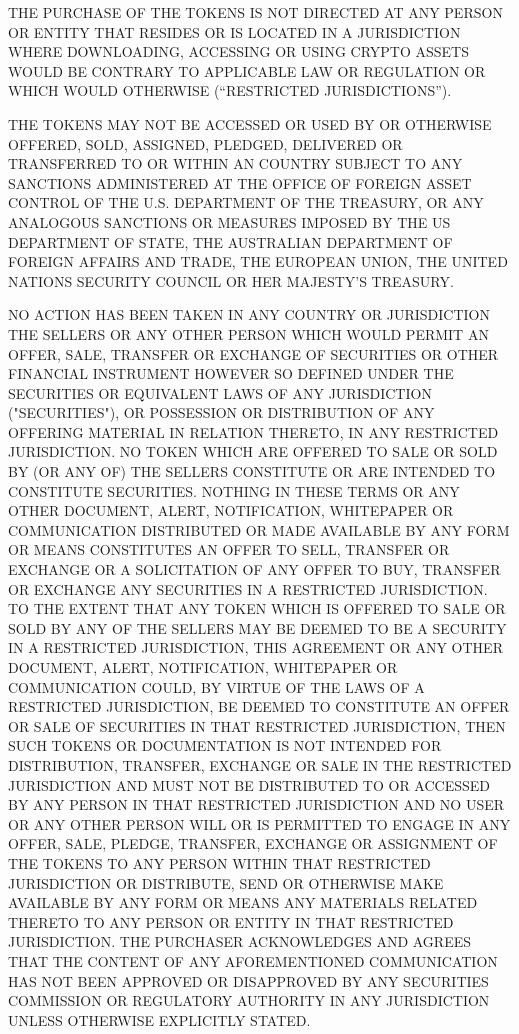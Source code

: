 ﻿\documentclass[a4paper]{article}
\begin{document}
THE PURCHASE OF THE TOKENS IS  NOT DIRECTED AT ANY PERSON OR ENTITY THAT RESIDES OR IS LOCATED IN A JURISDICTION WHERE DOWNLOADING, ACCESSING OR USING CRYPTO ASSETS WOULD BE CONTRARY TO APPLICABLE LAW OR REGULATION OR WHICH WOULD OTHERWISE (“RESTRICTED JURISDICTIONS”).
 
 
THE TOKENS MAY NOT BE ACCESSED OR USED BY OR OTHERWISE OFFERED, SOLD, ASSIGNED, PLEDGED, DELIVERED OR TRANSFERRED TO OR WITHIN AN COUNTRY SUBJECT TO ANY SANCTIONS ADMINISTERED AT THE OFFICE OF FOREIGN ASSET CONTROL OF THE U.S. DEPARTMENT OF THE TREASURY, OR ANY ANALOGOUS SANCTIONS OR MEASURES IMPOSED BY THE US DEPARTMENT OF STATE, THE AUSTRALIAN DEPARTMENT OF FOREIGN AFFAIRS AND TRADE, THE EUROPEAN UNION, THE UNITED NATIONS SECURITY COUNCIL OR HER MAJESTY'S TREASURY.
 
NO ACTION HAS BEEN TAKEN IN ANY COUNTRY OR JURISDICTION THE SELLERS OR ANY OTHER PERSON WHICH WOULD PERMIT AN OFFER, SALE, TRANSFER OR EXCHANGE OF SECURITIES OR OTHER FINANCIAL INSTRUMENT HOWEVER SO DEFINED UNDER THE SECURITIES OR EQUIVALENT LAWS OF ANY JURISDICTION ("SECURITIES"), OR POSSESSION OR DISTRIBUTION OF ANY OFFERING MATERIAL IN RELATION THERETO, IN ANY RESTRICTED JURISDICTION. NO TOKEN WHICH ARE OFFERED TO SALE OR SOLD BY (OR ANY OF) THE SELLERS CONSTITUTE OR ARE INTENDED TO CONSTITUTE SECURITIES.
NOTHING IN THESE TERMS OR ANY OTHER DOCUMENT, ALERT, NOTIFICATION, WHITEPAPER OR COMMUNICATION DISTRIBUTED OR MADE AVAILABLE BY ANY FORM OR MEANS CONSTITUTES AN OFFER TO SELL, TRANSFER OR EXCHANGE OR A SOLICITATION OF ANY OFFER TO BUY, TRANSFER OR EXCHANGE ANY SECURITIES IN A RESTRICTED JURISDICTION.
TO THE EXTENT THAT ANY TOKEN WHICH IS OFFERED TO SALE OR SOLD BY ANY OF THE SELLERS MAY BE DEEMED TO BE A SECURITY IN A RESTRICTED JURISDICTION, THIS AGREEMENT OR ANY OTHER DOCUMENT, ALERT, NOTIFICATION, WHITEPAPER OR COMMUNICATION COULD, BY VIRTUE OF THE LAWS OF A RESTRICTED JURISDICTION, BE DEEMED TO CONSTITUTE AN OFFER OR SALE OF SECURITIES IN THAT RESTRICTED JURISDICTION, THEN SUCH TOKENS OR DOCUMENTATION IS NOT INTENDED FOR DISTRIBUTION, TRANSFER, EXCHANGE OR SALE IN THE RESTRICTED JURISDICTION AND MUST NOT BE DISTRIBUTED TO OR ACCESSED BY ANY PERSON IN THAT RESTRICTED JURISDICTION AND NO USER OR ANY OTHER PERSON WILL OR IS PERMITTED TO ENGAGE IN ANY OFFER, SALE, PLEDGE, TRANSFER, EXCHANGE OR ASSIGNMENT OF THE TOKENS TO ANY PERSON WITHIN THAT RESTRICTED JURISDICTION OR DISTRIBUTE, SEND OR OTHERWISE MAKE AVAILABLE BY ANY FORM OR MEANS ANY MATERIALS RELATED THERETO TO ANY PERSON OR ENTITY IN THAT RESTRICTED JURISDICTION.
THE PURCHASER ACKNOWLEDGES AND AGREES THAT THE CONTENT OF ANY AFOREMENTIONED COMMUNICATION HAS NOT BEEN APPROVED OR DISAPPROVED BY ANY SECURITIES COMMISSION OR REGULATORY AUTHORITY IN ANY JURISDICTION UNLESS OTHERWISE EXPLICITLY STATED.
\end{document}

